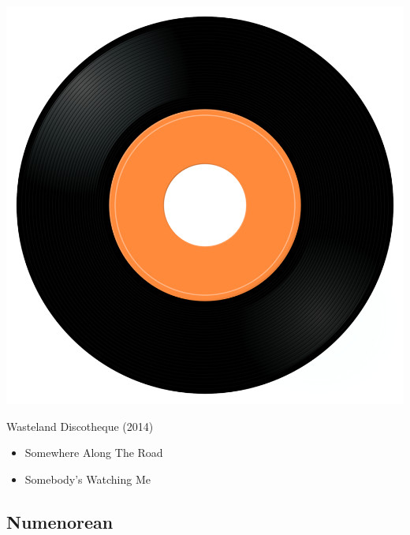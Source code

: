 \begin{minipage}[t]{0.25\textwidth}\vspace{0pt}
\captionsetup{type=figure}
\includegraphics[width=\textwidth]{Images/cover.png}
\caption*{Wasteland Discotheque (2014)}
\end{minipage}
\begin{minipage}[t]{0.25\textwidth}\vspace{0pt}
\begin{itemize}[nosep,leftmargin=1em,labelwidth=*,align=left]
	\setlength{\itemsep}{0pt}
	\item Somewhere Along The Road
	\item Somebody's Watching Me
\end{itemize}
\end{minipage}


\subsection{Numenorean}


